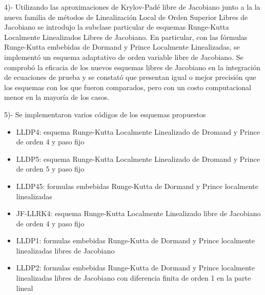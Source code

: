 \begin{conclusions}
    
    4)- Utilizando las aproximaciones de Krylov-Padé libre de Jacobiano junto a la la nueva familia de métodos de  Linealización Local de Orden Superior Libres de Jacobiano se introdujo la subclase particular de esquemas Runge-Kutta Localmente Linealizados Libres de Jacobiano. En particular, con las fórmulas Runge-Kutta embebidas de Dormand y  Prince Localmente Linealizadas, se implementó un esquema adaptativo de orden variable libre de Jacobiano. Se comprobó la eficacia de los nuevos esquemas libres de Jacobiano en la integración de ecuaciones de prueba y se constató que presentan igual o mejor precisión que los esquemas con los que fueron comparados, pero con un costo computacional menor en la mayoría de los casos. 


	5)- Se implementaron varios códigos de los esquemas propuestos
	\begin{itemize}
		\item LLDP4: esquema Runge-Kutta Localmente Linealizado de Dromand y Prince de orden 4 y paso fijo
		\item LLDP5: esquema Runge-Kutta Localmente Linealizado de Dromand y Prince de orden 5 y paso fijo
		\item LLDP45: formulas embebidas Runge-Kutta de Dormand y Prince localmente linealizadas
		\item JF-LLRK4: esquema Runge-Kutta Localmente Linealizado libre de Jacobiano de orden 4 y paso fijo
		\item LLDP1: formulas embebidas Runge-Kutta de Dormand y Prince localmente linealizadas libres de Jacobiano
		\item LLDP2: formulas embebidas Runge-Kutta de Dormand y Prince localmente linealizadas libres de Jacobiano con diferencia finita de orden 1 en la parte lineal
	\end{itemize}


\end{conclusions}
